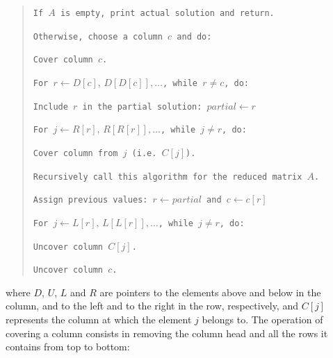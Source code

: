 \documentclass[12pt]{article}
\begin{document}
{\small
  \begin{quote}
    \texttt{If $A$ is empty, print actual solution and return.}

    \texttt{Otherwise, choose a column $c$ and do:}

       \hspace{0.5cm}\texttt{Cover column $c$.}

       \hspace{0.5cm}\texttt{For $r \leftarrow D{\left[ c \right]} , \, D{\left[ D{\left[ c \right]} \right]} , \dots$, while $r \neq c$, do:}

          \hspace{1cm}\texttt{Include $r$ in the partial solution: $partial \leftarrow r$}

          \hspace{1cm}\texttt{For $j \leftarrow R{\left[ r \right]}, \, R{\left[ R{\left[ r \right]} \right]} , \dots$, while $j \neq r$, do:}

             \hspace{1.5cm}\texttt{Cover column from $j$ (i.e.\ $C \left[ j \right]$).}

          \hspace{1cm}\texttt{Recursively call this algorithm for the reduced matrix $A$.}

          \hspace{1cm}\texttt{Assign previous values: $r \leftarrow partial$ and $c \leftarrow c[r]$}

          \hspace{1cm}\texttt{For $j \leftarrow L{\left[ r \right]}, \, L{\left[ L{\left[ r \right]} \right]} , \dots$, while $j \neq r$, do:}

             \hspace{1.5cm}\texttt{Uncover column $C \left[ j \right]$.}

    \texttt{Uncover column $c$.}
  \end{quote}
}

\linespread{1.5}

\noindent where $D$, $U$, $L$ and $R$ are pointers to the elements above and below in the column, and to the left and to the right in the row, respectively, and $C \left[ j \right]$ represents the column at which the element $j$ belongs to.
The operation of covering a column consists in removing the column head and all the rows it contains from top to bottom:

\linespread{0.8}
\end{document}
